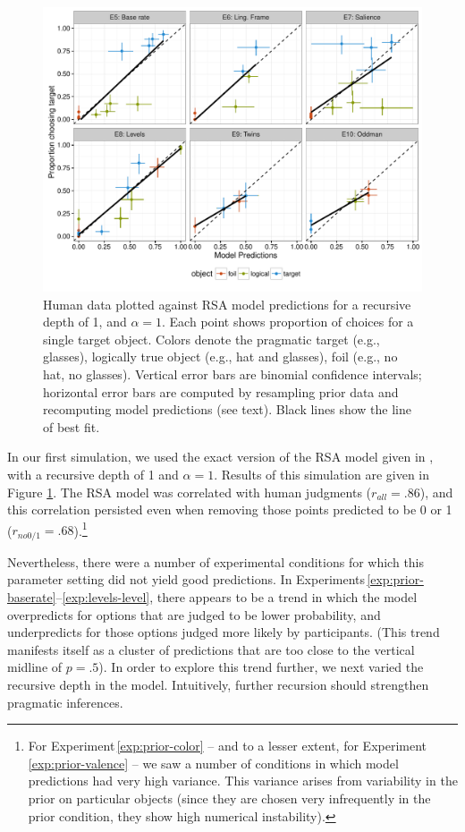 \documentclass[man,noapacite]{apa2}
\newcounter{Experiment}
\newcommand{\exptref}[1]{Experiment\,\ref{#1}}
\newcommand{\exptrefrange}[2]{Experiments\,\ref{#1}--\ref{#2}}
\begin{document}
\begin{figure}[t]
 \centering
 \includegraphics[width=6in]{../plots/model_basic.pdf}
 \caption{\label{fig:basic} Human data plotted against RSA model predictions for a recursive depth of 1, and $\alpha=1$. Each point shows proportion of choices for a single target object. Colors denote the pragmatic target (e.g., glasses), logically true object (e.g., hat and glasses), foil (e.g., no hat, no glasses). Vertical error bars are binomial confidence intervals; horizontal error bars are computed by resampling prior data and recomputing model predictions (see text). Black lines show the line of best fit.}
\end{figure}

In our first simulation, we used the exact version of the RSA model given in , with a recursive depth of 1 and $\alpha=1$. Results of this simulation are given in Figure \ref{fig:basic}. The RSA model was correlated with human judgments ($r_{all} = .86$), and this correlation persisted even when removing those points predicted to be 0 or 1 ($r_{no 0/1} = .68$).\footnote{For \exptref{exp:prior-color} -- and to a lesser extent, for \exptref{exp:prior-valence} -- we saw a number of conditions in which model predictions had very high variance. This variance arises from variability in the prior on particular objects (since they are chosen very infrequently in the prior condition, they show high numerical instability).}

Nevertheless, there were a number of experimental conditions for which this parameter setting did not yield good predictions. In \exptrefrange{exp:prior-baserate}{exp:levels-level}, there appears to be a trend in which the model overpredicts for options that are judged to be lower probability, and underpredicts for those options judged more likely by participants. (This trend manifests itself as a cluster of predictions that are too close to the vertical midline of $p=.5$). In order to explore this trend further, we next varied the recursive depth in the model. Intuitively, further recursion should strengthen pragmatic inferences.
\end{document}
